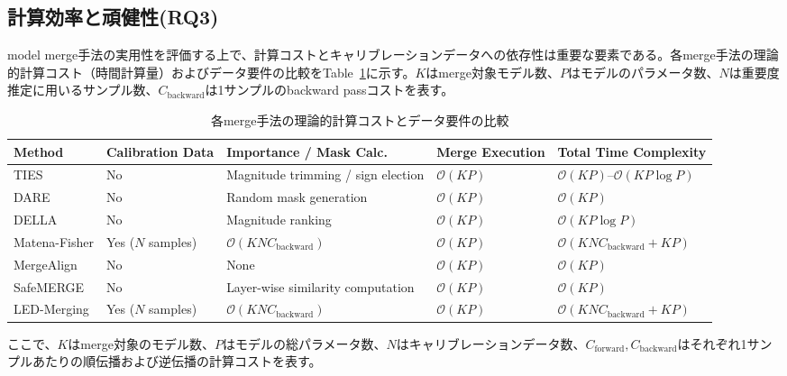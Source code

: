 \documentclass{article}
\begin{document}
\subsection{計算効率と頑健性(RQ3)}
model merge手法の実用性を評価する上で、計算コストとキャリブレーションデータへの依存性は重要な要素である。各merge手法の理論的計算コスト（時間計算量）およびデータ要件の比較をTable~\ref{tab:cost}に示す。$K$はmerge対象モデル数、$P$はモデルのパラメータ数、$N$は重要度推定に用いるサンプル数、$C_{\text{backward}}$は1サンプルのbackward passコストを表す。

\begin{table}[htbp]
\caption{各merge手法の理論的計算コストとデータ要件の比較}
\label{tab:cost}
\centering
\small
\setlength{\tabcolsep}{3pt}
\renewcommand{\arraystretch}{1.10}
\begin{tabularx}{\textwidth}{
>{\raggedright\arraybackslash}p{1.85cm}
>{\centering\arraybackslash}p{1.70cm}
>{\raggedright\arraybackslash}p{3.25cm}
>{\centering\arraybackslash}p{1.75cm}
>{\raggedright\arraybackslash}X
}
\toprule
\textbf{Method} &
\textbf{Calibration Data} &
\textbf{Importance / Mask Calc.} &
\textbf{Merge Execution} &
\textbf{Total Time Complexity} \\
\midrule
TIES
& No
& Magnitude trimming / sign election
& $\mathcal{O}(KP)$
& $\mathcal{O}(KP)$--$\mathcal{O}(KP\log P)$ \\
\midrule
DARE
& No
& Random mask generation
& $\mathcal{O}(KP)$
& $\mathcal{O}(KP)$ \\
\midrule
DELLA
& No
& Magnitude ranking
& $\mathcal{O}(KP)$
& $\mathcal{O}(KP\log P)$ \\
\midrule
Matena-Fisher
& Yes ($N$ samples)
& $\mathcal{O}(KN C_{\text{backward}})$
& $\mathcal{O}(KP)$
& $\mathcal{O}(KN C_{\text{backward}} + KP)$ \\
\midrule
MergeAlign
& No
& None
& $\mathcal{O}(KP)$
& $\mathcal{O}(KP)$ \\
\midrule
SafeMERGE
& No
& Layer-wise similarity computation
& $\mathcal{O}(KP)$
& $\mathcal{O}(KP)$ \\
\midrule
LED-Merging
& Yes ($N$ samples)
& $\mathcal{O}(KN C_{\text{backward}})$
& $\mathcal{O}(KP)$
& $\mathcal{O}(KN C_{\text{backward}} + KP)$ \\
\bottomrule
\end{tabularx}
\end{table}

ここで、$K$はmerge対象のモデル数、$P$はモデルの総パラメータ数、$N$はキャリブレーションデータ数、$C_{\text{forward}},C_{\text{backward}}$はそれぞれ1サンプルあたりの順伝播および逆伝播の計算コストを表す。
\end{document}
